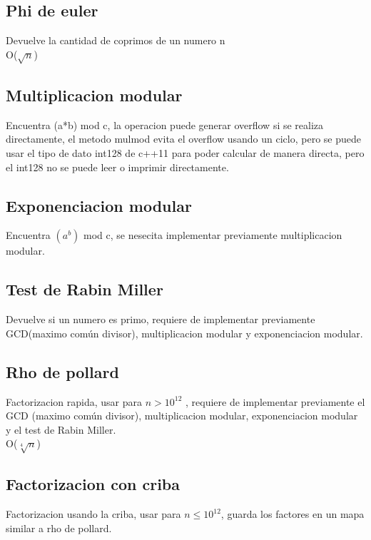 \documentclass[10pt,landscape,twocolumn,a4paper,notitlepage]{article}
\newcommand\cppfile[2][]{

}
\begin{document}
			\subsection{Phi de euler}
			Devuelve la cantidad de coprimos de un numero n\\
			O($\sqrt{n}$) 
			\cppfile[5-14]{matematicas/phi_de_euler.cpp}
			\subsection{Multiplicacion modular}
			Encuentra (a*b) mod c, la operacion puede generar overflow
				si se realiza directamente, el metodo mulmod evita el overflow usando un
				ciclo, pero se puede usar el tipo de dato int128 de c++11 para poder calcular
				de manera directa, pero el int128 no se puede leer o imprimir directamente.
			\cppfile[5-26]{matematicas/multiplicacion_modular.cpp}
			\subsection{Exponenciacion modular}
			Encuentra $(a^b)$ mod c, se nesecita implementar previamente multiplicacion modular.
			\cppfile[16-20]{matematicas/exp_modular.cpp}
			\subsection{Test de Rabin Miller}
			Devuelve si un numero es primo, requiere de implementar previamente GCD(maximo común divisor),
			multiplicacion modular y exponenciacion modular.
			\cppfile[27-50]{matematicas/test_de_rabin_miller.cpp}
			\subsection{Rho de pollard}
			Factorizacion rapida, usar para $n > 10^{12}$ , requiere de implementar previamente el GCD
			(maximo común divisor), multiplicacion modular,	exponenciacion modular y el test de Rabin Miller.\\
			O($\sqrt[4]{n}$)
			\cppfile[52-77]{matematicas/rho_de_pollard.cpp}
			\subsection{Factorizacion con criba}
			Factorizacion usando la criba, usar para $n \leq 10^{12}$, guarda los factores en un mapa 
			similar a rho de pollard.
			\cppfile[10-48]{matematicas/factorizacion_criba.cpp}
\end{document}
